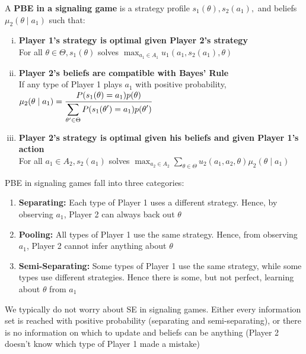 \documentclass{report}
\begin{document}
A \textbf{PBE in a signaling game} is a strategy profile $s_1(\theta), s_2(a_1),$ and beliefs $\mu_2(\theta \mid a_1)$ such that:
\begin{enumerate}[(i)]
	\item \textbf{Player 1's strategy is optimal given Player 2's strategy}\\[5pt]
	For all $\theta \in \Theta, s_1(\theta)$ solves $\displaystyle\max_{a_1 \in A_1} u_1(a_1,s_2(a_1),\theta)$ \hspace{20pt} 
	\item \textbf{Player 2's beliefs are compatible with Bayes' Rule}\\[5pt]
	If any type of Player 1 plays $a_1$ with positive probability, $\mu_2(\theta \mid a_1) = \cfrac{P(s_1(\theta) = a_1) p(\theta)}{\displaystyle\sum_{\theta' \in \Theta} P(s_1(\theta')=a_1)p(\theta')}$
	\item \textbf{Player 2's strategy is optimal given his beliefs and given Player 1's action}\\[5pt]
	For all $a_1 \in A_2, s_2(a_1)$ solves $\displaystyle\max_{a_2 \in A_2} \displaystyle\sum_{\theta \in \Theta} u_2(a_1,a_2,\theta) \mu_2(\theta \mid a_1)$
\end{enumerate} \bigskip \bigskip


PBE in signaling games fall into three categories:
\begin{enumerate}[1]
	\item \textbf{Separating:} Each type of Player 1 uses a different strategy. Hence, by observing $a_1$, Player 2 can always back out $\theta$
	\item \textbf{Pooling:} All types of Player 1 use the same strategy. Hence, from observing $a_1$, Player 2 cannot infer anything about $\theta$
	\item \textbf{Semi-Separating:} Some types of Player 1 use the same strategy, while some types use different strategies. Hence there is some, but not perfect, learning about $\theta$ from $a_1$
\end{enumerate} \bigskip

We typically do not worry about SE in signaling games. Either every information set is reached with positive probability (separating and semi-separating), or there is no information on which to update and beliefs can be anything (Player 2 doesn't know which type of Player 1 made a mistake) \bigskip
\end{document}
